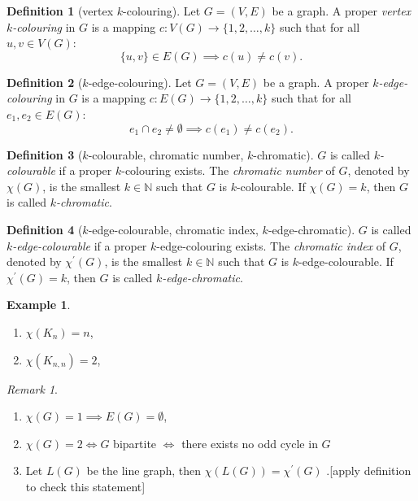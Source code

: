 \documentclass[a4paper]{article}
\theoremstyle{definition}\newtheorem*{defi*}{Definition}
\theoremstyle{remark}\newtheorem*{rem}{Remark}
\theoremstyle{plain}\newtheorem{lemma}[cnt]{Lemma}
\theoremstyle{definition}\newtheorem*{ex}{Example}
\theoremstyle{definition}\newtheorem*{exs}{Examples}
\theoremstyle{plain}\newtheorem{theorem}[cnt]{Theorem}
\theoremstyle{plain}\newtheorem{prop}[cnt]{Proposition}
\theoremstyle{plain}\newtheorem*{cor*}{Corollary}
\theoremstyle{definition}\newtheorem{nota}{Notation}
\theoremstyle{definition}\newtheorem*{nota*}{Notation}
\theoremstyle{plain}\newtheorem{conj}[cnt]{Conjecture}
\newcommand{\N}{\mathbb{N}}
\begin{document}
\begin{defi*}[vertex $k$-colouring]
  Let $G=(V,E)$ be a graph. A proper \emph{vertex $k$-colouring} in $G$ is a mapping
  $c: V(G) \to \{1,2,\dots,k\}$
  such that for all $u,v \in V(G)$:
  \[ \{u,v\} \in E(G) \implies c(u) \neq c(v) \text{.} \]
\end{defi*}

\begin{defi*}[$k$-edge-colouring]
  Let $G=(V,E)$ be a graph. A proper \emph{$k$-edge-colouring} in $G$ is a mapping 
  $c: E(G) \to \{1,2,\dots,k\}$
  such that for all $e_1,e_2 \in E(G)$:
  \[ e_1 \cap e_2 \neq \emptyset \implies c(e_1) \neq c(e_2) \text{.} \]
\end{defi*}

\begin{defi*}[$k$-colourable, chromatic number, $k$-chromatic]
  $G$ is called \emph{$k$-colourable} if a proper $k$-colouring exists.
  The \emph{chromatic number} of $G$, denoted by $\chi(G)$, is the smallest $k \in \N$ such that $G$ is $k$-colourable.
  If $\chi(G) = k$, then $G$ is called \emph{$k$-chromatic}.
\end{defi*}

\begin{defi*}[$k$-edge-colourable, chromatic index, $k$-edge-chromatic]
  $G$ is called \emph{$k$-edge-colourable} if a proper $k$-edge-colouring exists.
  The \emph{chromatic index} of $G$, denoted by $\chi^\prime(G)$, is the smallest $k \in \N$ such that $G$ is $k$-edge-colourable.
  If $\chi^\prime(G) = k$, then $G$ is called \emph{$k$-edge-chromatic}.
\end{defi*}

\begin{ex}
  \begin{enumerate}[label=(\alph*)]
    \item $\chi(K_n) = n$,
    \item $\chi(K_{n,n}) = 2$, 
  \end{enumerate}  
\end{ex}

\begin{rem}
  \begin{enumerate}
    \item $\chi(G) = 1 \implies E(G) = \emptyset$,
    \item $\chi(G) = 2 \iff G$ bipartite $\iff$ there exists no odd cycle in $G$
    \item Let $L(G)$ be the line graph, then $\chi(L(G)) = \chi^\prime(G)$ .[apply definition to check this statement]
  \end{enumerate}
\end{rem}
\end{document}
